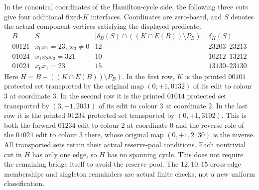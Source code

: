 In the canonical coordinates of the Hamilton-cycle side, the following
three cuts give four additional fixed-$K$ interfaces. Coordinates are
zero-based, and $S$ denotes the actual component vertices satisfying
the displayed predicate.
\[
\begin{array}{c|c|c|c}
B&S&|\delta_B(S)\cap((K\cap E(B))\setminus P_B)|
  &\delta_H(S)\\\hline
00121&x_0x_1=23,\ x_3\ne0&12&23203\text{--}23213\\
01024&x_1x_2x_3=321&10&10212\text{--}13212\\
01024&x_0x_1=23&15&13130\text{--}23130
\end{array}
\]
Here $H=B-((K\cap E(B))\setminus P_B)$. In the first row,
$K$ is the printed $00101$ protected set transported by the original
map $(0,+1,0132)$ of its edit to colour $3$ at coordinate $3$.
In the second row it is the printed $01014$ protected set transported
by $(3,-1,2031)$ of its edit to colour $3$ at coordinate $2$.
In the last row it is the printed $01234$ protected set transported
by $(0,+1,3102)$. This is both the forward $01234$ edit to colour $2$
at coordinate $0$ and the reverse role of the $01024$ edit to colour
$3$ there, whose original map $(0,+1,2130)$ is the inverse.
All transported sets retain their actual reserve-pool conditions.
Each nontrivial cut in $H$ has only one edge, so $H$ has no spanning
cycle. This does not require the remaining bridge itself to avoid
the reserve pool. The $12,10,15$ cross-edge memberships and singleton
remainders are actual finite checks, not a new uniform classification.
